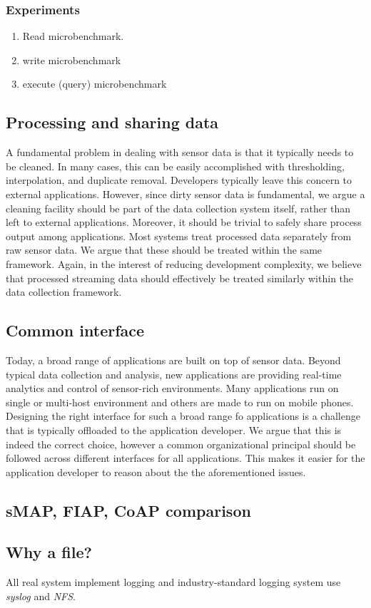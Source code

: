 \subsubsection{Experiments}
\begin{enumerate}
\item Read microbenchmark.
\item write microbenchmark 
\item execute (query) microbenchmark 
\end{enumerate}

\subsection{Processing and sharing data}
A fundamental problem in dealing with sensor data is that it typically needs to be cleaned.  In many cases, this can be easily accomplished
with thresholding, interpolation, and duplicate removal.  Developers typically leave this concern to external applications.  However, since 
dirty sensor data is fundamental, we argue a cleaning facility should be part of the data collection system itself, rather than left
to external applications.  Moreover, it should be trivial to safely share process output among applications.  Most systems treat processed
data separately from raw sensor data.  We argue that these should be treated within the same framework.  Again, in the interest of reducing
development complexity, we believe that processed streaming data should effectively be treated similarly within the data collection
framework.



\subsection{Common interface}
Today, a broad range of applications are built on top of sensor data.  Beyond typical data collection and analysis, new applications
are providing real-time analytics and control of sensor-rich environments.  Many applications run on single or multi-host
environment and others are made to run on mobile phones.  Designing the right interface for such a broad range fo applications is a challenge
that is typically offloaded to the application developer.  We argue that this is indeed the correct choice, however a common 
organizational principal should be followed across different interfaces for all applications.  This makes it easier for the 
application developer to reason about the the aforementioned issues.



\subsection{sMAP, FIAP, CoAP comparison}




\subsection{Why a file?}
All real system implement logging and industry-standard logging system use \emph{syslog} and \emph{NFS}.
